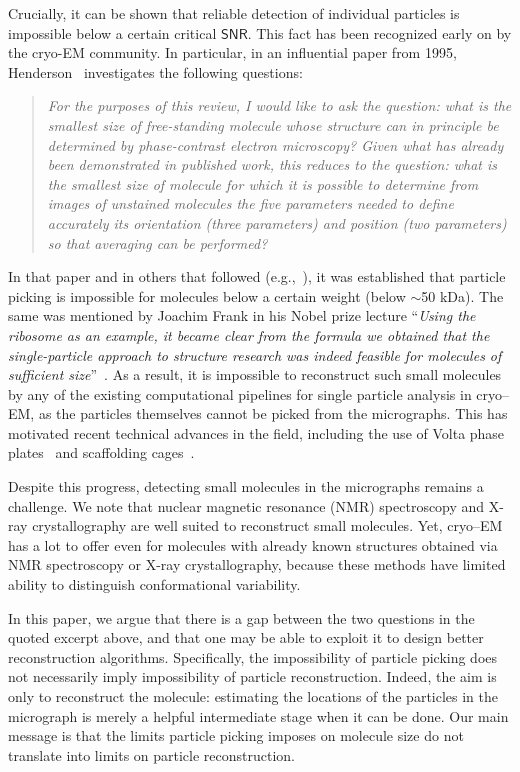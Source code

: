 \documentclass[english,11pt]{article}
\newcommand{\1}{\mathbf{1}}
\newcommand{\TODO}[1]{{\color{red}{[#1]}}}
\numberwithin{equation}{section}
\theoremstyle{plain}
\theoremstyle{definition}
\theoremstyle{remark}
\theoremstyle{plain}
\theoremstyle{remark}
\theoremstyle{plain}
\theoremstyle{plain}
\newcommand{\SNR}{\ensuremath{\textsf{SNR}}}
\begin{document}
Crucially, it can be shown that reliable detection of individual particles is impossible below a certain critical $\SNR$. This fact has been recognized early on by the cryo-EM community. In particular, in an influential paper from 1995, Henderson~\cite{henderson1995limitations} investigates the following questions:
\begin{quote}
	\emph{For the purposes of this review, I would like to ask the question: what is the smallest size of free-standing molecule whose structure can in principle be determined by phase-contrast electron microscopy? Given what has already been demonstrated in published work, this reduces to the question: what is the smallest size of molecule for which it is possible to determine from images of unstained molecules the five parameters needed to define accurately its orientation (three parameters) and position (two parameters) so that averaging can be performed?}
\end{quote}
In that paper and in others that followed (e.g.,~\cite{glaeser1999electron}), it was established that particle picking is impossible for molecules below a certain weight (below $\sim$50 kDa). The same was mentioned by Joachim Frank in his Nobel prize lecture ``\emph{Using the ribosome as an example, it became clear from the formula we obtained that the single-particle approach to structure research was indeed feasible for molecules of sufficient size}''~\cite{frank2018single}. 
As a result, it is impossible to reconstruct such small molecules by any of the existing computational pipelines for single particle analysis in cryo--EM, as the particles themselves cannot be picked from the micrographs.
This has motivated recent technical advances in the field, including the use of Volta phase plates~\cite{khoshouei2017cryo,liang2017phase} and scaffolding cages~\cite{liu2018nearatomic}.

Despite this progress, detecting small molecules in the micrographs remains a challenge.
We note that nuclear magnetic resonance (NMR) spectroscopy and X-ray crystallography are well suited to reconstruct small molecules. Yet, cryo--EM has a lot to offer even for molecules with already known structures obtained via NMR spectroscopy or X-ray crystallography, because these methods have limited ability to distinguish conformational variability. \TODO{Need a ref for this claim.}

In this paper, we argue that there is a gap between the two questions in the quoted excerpt above, and that one may be able to exploit it to design better reconstruction algorithms.
Specifically, the impossibility of particle picking does not necessarily imply impossibility of particle reconstruction.
Indeed, the aim is only to reconstruct the molecule: estimating the locations of the particles in the micrograph is merely a helpful intermediate stage when it can be done. Our main message is that the limits particle picking imposes on molecule size do not translate into limits on particle reconstruction.
\end{document}

